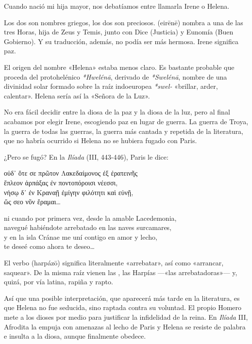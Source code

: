 \label{cap:helena}

Cuando nació mi hija mayor, nos debatíamos entre llamarla Irene o Helena.

Los dos son nombres griegos, los dos son preciosos.  (eirēnē) nombra a una de las tres Horas, hija de Zeus y Temis, junto con Dice (Justicia) y Eunomía (Buen Gobierno). Y su traducción, además, no podía ser más hermosa. Irene significa paz.

El origen del nombre «Helena» estaba menos claro. Es bastante probable que proceda del protohelénico \emph{*Hwelénā}, derivado de \emph{*Swelénā}, nombre de una divinidad solar formado sobre la raíz indoeuropea \emph{*swel-} «brillar, arder, calentar». Helena sería así la «Señora de la Luz».

No era fácil decidir entre la diosa de la paz y la diosa de la luz, pero al final acabamos por elegir Irene, escogiendo paz en lugar de guerra. La guerra de Troya, la guerra de todas las guerras, la guerra más cantada y repetida de la literatura, que no habría ocurrido si Helena no se hubiera fugado con Paris.

¿Pero se fugó? En la \emph{Ilíada} (III, 443-446), Paris le dice:

\begin{versocita}
\foreignlanguage{greek}{οὐδ᾽ ὅτε σε πρῶτον Λακεδαίμονος ἐξ ἐρατεινῆς\\
ἔπλεον ἁρπάξας ἐν ποντοπόροισι νέεσσι,\\
νήσῳ δ᾽ ἐν Κραναῇ ἐμίγην φιλότητι καὶ εὐνῇ,\\
ὥς σεο νῦν ἔραμαι…}
\end{versocita}

\begin{versocita}
ni cuando por primera vez, desde la amable Lacedemonia,\\
navegué habiéndote arrebatado en las naves surcamares,\\
y en la isla Cránae me uní contigo en amor y lecho,\\
te deseé como ahora te deseo…
\end{versocita}

El verbo  (harpázō) significa literalmente «arrebatar», así como «arrancar, saquear». De la misma raíz vienen las , las Harpías ---«las arrebatadoras»--- y, quizá, por vía latina, rapiña y rapto.

Así que una posible interpretación, que aparecerá más tarde en la literatura, es que Helena no fue seducida, sino raptada contra su voluntad. El propio Homero mete a los dioses por medio para justificar la infidelidad de la reina. En \emph{Ilíada} III, Afrodita la empuja con amenazas al lecho de Paris y Helena se resiste de palabra e insulta a la diosa, aunque finalmente obedece.

